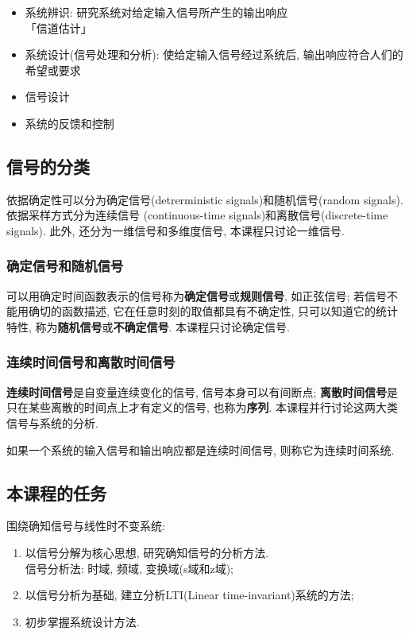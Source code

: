         \begin{itemize}
            \item 系统辨识: 研究系统对给定输入信号所产生的输出响应 \\
                「信道估计」
            \item 系统设计(信号处理和分析): 使给定输入信号经过系统后, 输出响应符合人们的希望或要求    
            \item 信号设计
            \item 系统的反馈和控制
        \end{itemize}

    \subsection{信号的分类}

        依据确定性可以分为确定信号(detrerministic signals)和随机信号(random signals). 依据采样方式分为连续信号 (continuous-time signals)和离散信号(discrete-time signals). 此外, 还分为一维信号和多维度信号, 本课程只讨论一维信号.

        \subsubsection{确定信号和随机信号}

        可以用确定时间函数表示的信号称为\textbf{确定信号}或\textbf{规则信号}, 如正弦信号; 若信号不能用确切的函数描述, 它在任意时刻的取值都具有不确定性, 只可以知道它的统计特性, 称为\textbf{随机信号}或\textbf{不确定信号}. 本课程只讨论确定信号.

        \subsubsection{连续时间信号和离散时间信号}

        \textbf{连续时间信号}是自变量连续变化的信号, 信号本身可以有间断点; \textbf{离散时间信号}是只在某些离散的时间点上才有定义的信号, 也称为\textbf{序列}. 本课程并行讨论这两大类信号与系统的分析.

        如果一个系统的输入信号和输出响应都是连续时间信号, 则称它为连续时间系统.

    \subsection{本课程的任务}

        围绕确知信号与线性时不变系统:
        \begin{enumerate}
            \item 以信号分解为核心思想, 研究确知信号的分析方法. \\
                信号分析法: 时域, 频域, 变换域(s域和z域);
            \item 以信号分析为基础, 建立分析LTI(Linear time-invariant)系统的方法;
            \item 初步掌握系统设计方法.
        \end{enumerate}
